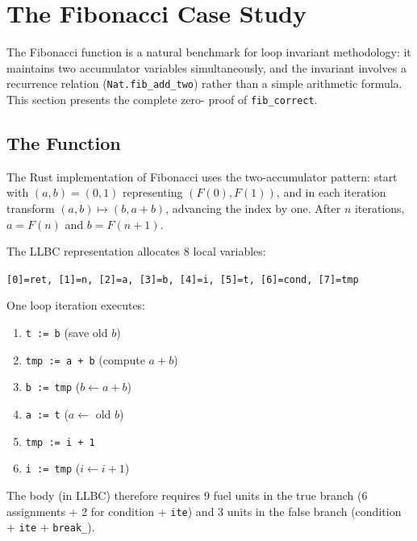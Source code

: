 
\section{The Fibonacci Case Study}
\label{sec:fib}

The Fibonacci function is a natural benchmark for loop invariant methodology:
it maintains two accumulator variables simultaneously, and the invariant
involves a recurrence relation (\texttt{Nat.fib\_add\_two}) rather than
a simple arithmetic formula. This section presents the complete zero-\sorry
proof of \texttt{fib\_correct}.

\subsection{The Function}

The Rust implementation of Fibonacci uses the two-accumulator pattern:
start with $(a, b) = (0, 1)$ representing $(F(0), F(1))$, and in each
iteration transform $(a, b) \mapsto (b, a+b)$, advancing the index by one.
After $n$ iterations, $a = F(n)$ and $b = F(n+1)$.

The LLBC representation allocates 8 local variables:
\begin{center}
\texttt{[0]=ret, [1]=n, [2]=a, [3]=b, [4]=i, [5]=t, [6]=cond, [7]=tmp}
\end{center}

One loop iteration executes:
\begin{enumerate}[leftmargin=2em]
  \item \texttt{t   := b}         (save old $b$)
  \item \texttt{tmp := a + b}     (compute $a + b$)
  \item \texttt{b   := tmp}       ($b \leftarrow a + b$)
  \item \texttt{a   := t}         ($a \leftarrow$ old $b$)
  \item \texttt{tmp := i + 1}
  \item \texttt{i   := tmp}       ($i \leftarrow i + 1$)
\end{enumerate}

The body (in LLBC) therefore requires 9 fuel units in the true branch
(6 assignments + 2 for condition + \texttt{ite}) and 3 units in the false
branch (condition + \texttt{ite} + \texttt{break\_}).

